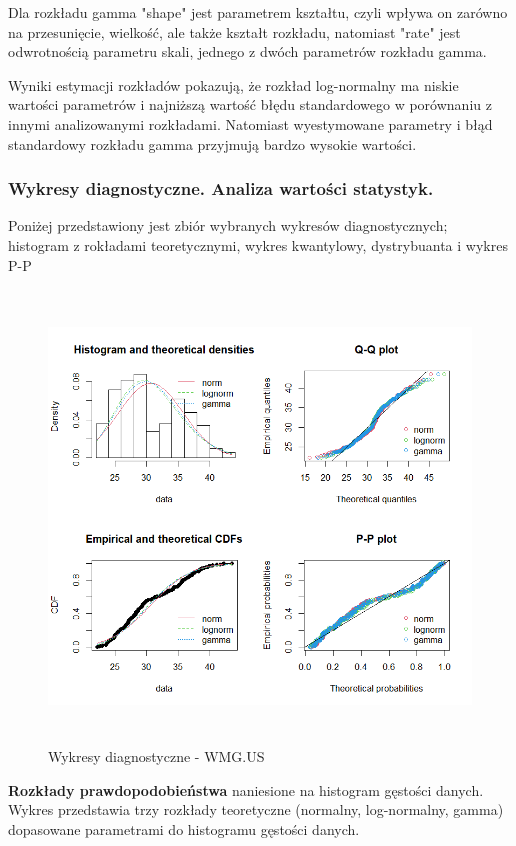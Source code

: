 \documentclass[a4paper,11pt]{article}
\begin{document}
Dla rozkładu gamma "shape" jest parametrem kształtu, czyli wpływa on zarówno na przesunięcie, wielkość, ale także kształt rozkładu, natomiast "rate" jest odwrotnością parametru skali, jednego z dwóch parametrów rozkładu gamma.

Wyniki estymacji rozkładów pokazują, że rozkład log-normalny ma niskie wartości parametrów i najniższą wartość błędu standardowego w porównaniu z innymi analizowanymi rozkładami. Natomiast wyestymowane parametry i błąd standardowy rozkładu gamma przyjmują bardzo wysokie wartości.

\subsubsection{Wykresy diagnostyczne. Analiza wartości statystyk.}
Poniżej przedstawiony jest zbiór wybranych wykresów diagnostycznych; histogram z rokładami teoretycznymi, wykres kwantylowy, dystrybuanta i wykres P-P
\begin{figure}[h]
\centering
\includegraphics[width=12cm, height=12cm]{img/Wykresy_diagnostyczne_WMG.png}
\caption{Wykresy diagnostyczne - WMG.US}
\end{figure}

\textbf{Rozkłady prawdopodobieństwa} naniesione na histogram gęstości danych. Wykres przedstawia trzy rozkłady teoretyczne (normalny, log-normalny, gamma) dopasowane parametrami do histogramu gęstości danych. 
\end{document}
